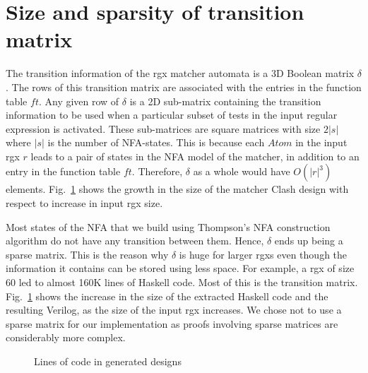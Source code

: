 
\section{Size and sparsity of transition matrix}
The transition information of the \gls{rgx} matcher automata is a 3D
Boolean matrix $\delta$.
The rows of this transition matrix are associated with the entries in
the function table $ft$.
Any given row of $\delta$ is a 2D sub-matrix containing the
transition information to be used when a particular subset of tests in the input
regular expression is activated.
These sub-matrices are square matrices with size $2|s|$ where $|s|$ is the
number of \gls{NFA}-states.
%
This is because 
each $Atom$ in the input \gls{rgx} $r$ leads to a pair of states in the
NFA model of the matcher, in addition to an entry in the function
table $ft$.
Therefore, $\delta$ as a whole would have $O(|r|^3)$ elements.
Fig.~\ref{graph:loc-design} shows the growth in the size of the
matcher Clash design with respect to increase in input \gls{rgx} size.

Most states of the \gls{NFA}
that we build using Thompson's \gls{NFA} construction algorithm do not
have any transition between them.
Hence, $\delta$ ends up being a sparse matrix.
This is the reason why $\delta$ is huge for larger \glspl{rgx} even
though the information it contains can be stored using less space.
For example, a \gls{rgx} of size 60 led to almost 160K lines of
Haskell code.
Most of this is the transition matrix.
Fig.~\ref{graph:loc-design} shows the increase in the size of the
extracted Haskell code and the resulting Verilog, as the size of the
input \gls{rgx} increases.
We chose not to use a sparse matrix for our implementation as proofs
involving sparse matrices are considerably more complex.

\begin{figure}
  \begin{center}
    
    \caption{Lines of code in generated designs}
    \label{graph:loc-design}
  \end{center}
\end{figure}

